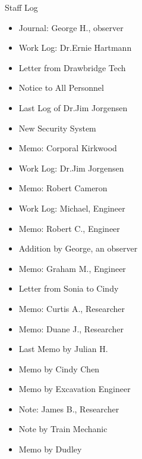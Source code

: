 \begin{stafflog}{Staff Log}
    \begin{itemize}
        \item Journal: George H., observer
        \item Work Log: Dr.Ernie Hartmann
        \item Letter from Drawbridge Tech
        \item Notice to All Personnel
        \item Last Log of Dr.Jim Jorgensen
        \item New Security System
        \item Memo: Corporal Kirkwood
        \item Work Log: Dr.Jim Jorgensen
        \item Memo: Robert Cameron
        \item Work Log: Michael, Engineer
        \item Memo: Robert C., Engineer
        \item Addition by George, an observer
        \item Memo: Graham M., Engineer
        \item Letter from Sonia to Cindy
        \item Memo: Curtis A., Researcher
        \item Memo: Duane J., Researcher
        \item Last Memo by Julian H.
        \item Memo by Cindy Chen
        \item Memo by Excavation Engineer
        \item Note: James B., Researcher
        \item Note by Train Mechanic
        \item Memo by Dudley
    \end{itemize}
\end{stafflog}
